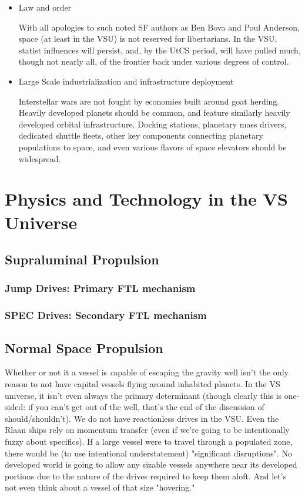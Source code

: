\begin{itemize}
\item Law and order

With all apologies to such noted SF authors as Ben Bova and Poul Anderson, space (at least in the VSU) is not
reserved for libertarians. In the VSU, statist influences will
persist, and, by the UtCS period, will have pulled much, though not
nearly all, of the frontier back under various degrees of control.

\item Large Scale industrialization and infrastructure deployment

Interstellar wars are not fought by economies built around goat
herding. Heavily developed planets should be common, and feature
similarly heavily developed orbital infrastructure. Docking stations,
planetary mass drivers, dedicated shuttle fleets, other key components
connecting planetary populations to space, and even various flavors of
space elevators should be widespread.

\end{itemize}


\section{Physics and Technology in the VS Universe}
\label{sec:VSphysics}

\subsection{Supraluminal Propulsion}

\subsubsection{Jump Drives: Primary FTL mechanism}

\subsubsection{SPEC Drives: Secondary FTL mechanism}

\subsection{Normal Space Propulsion}

Whether or not it a vessel is {\emph capable} of escaping the gravity well
isn't the only reason to not have capital vessels flying around
inhabited planets. In the VS universe, it isn't even always the
primary determinant (though clearly this is one-sided: if you can't
get out of the well, that's the end of the discussion of
should/shouldn't). We do not have reactionless drives in the VSU. Even
the Rlaan ships rely on momentum transfer (even if we're going to be
intentionally fuzzy about specifics). If a large vessel were to travel
through a populated zone, there would be (to use intentional
understatement) "significant disruptions". No developed world is going
to allow any sizable vessels anywhere near its developed portions due
to the nature of the drives required to keep them aloft. And let's not
even think about a vessel of that size "hovering."

